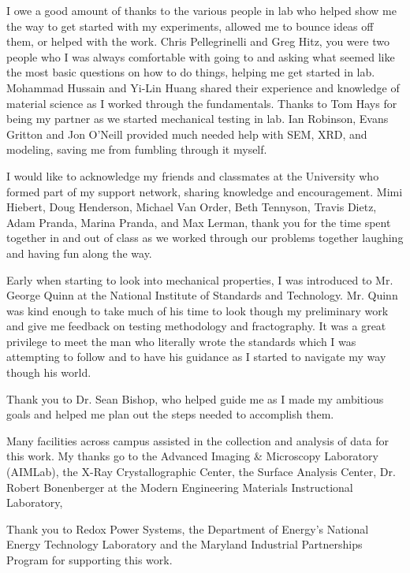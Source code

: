 I owe a good amount of thanks to the various people in lab who helped show me the way to get started with my experiments, allowed me to bounce ideas off them, or helped with the work.
Chris Pellegrinelli and Greg Hitz, you were two people who I was always comfortable with going to and asking what seemed like the most basic questions on how to do things, helping me get started in lab.
Mohammad Hussain and Yi-Lin Huang shared their experience and knowledge of material science as I worked through the fundamentals.
Thanks to Tom Hays for being my partner as we started mechanical testing in lab.
Ian Robinson, Evans Gritton and Jon O'Neill provided much needed help with SEM, XRD, and modeling, saving me from fumbling through it myself.

I would like to acknowledge my friends and classmates at the University who formed part of my support network, sharing knowledge and encouragement.
Mimi Hiebert, Doug Henderson, Michael Van Order, Beth Tennyson, Travis Dietz, Adam Pranda, Marina Pranda, and Max Lerman, thank you for the time spent together in and out of class as we worked through our problems together laughing and having fun along the way.

Early when starting to look into mechanical properties, I was introduced to Mr. George Quinn at the National Institute of Standards and Technology.
Mr. Quinn was kind enough to take much of his time to look though my preliminary work and give me feedback on testing methodology and fractography.
It was a great privilege to meet the man who literally wrote the standards which I was attempting to follow and to have his guidance as I started to navigate my way though his world.

Thank you to Dr. Sean Bishop, who helped guide me as I made my ambitious goals and helped me plan out the steps needed to accomplish them.

Many facilities across campus assisted in the collection and analysis of data for this work. My thanks go to the Advanced Imaging \& Microscopy Laboratory (AIMLab), the X-Ray Crystallographic Center, the Surface Analysis Center, Dr. Robert Bonenberger at the Modern Engineering Materials Instructional Laboratory,

Thank you to Redox Power Systems, the Department of Energy's National Energy Technology Laboratory and the Maryland Industrial Partnerships Program for supporting this work.
